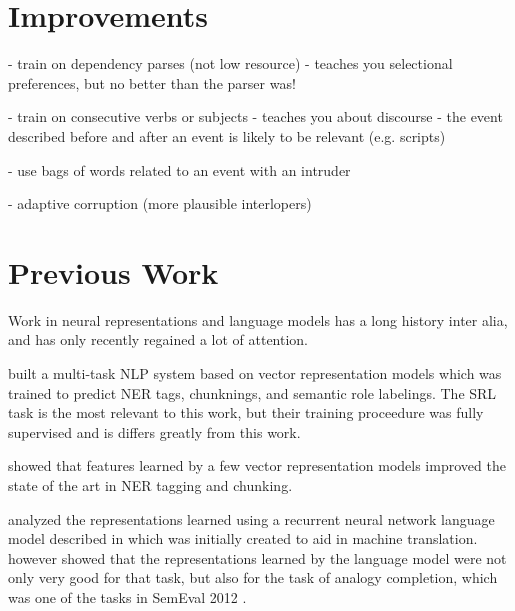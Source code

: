 \documentclass[11pt,letterpaper]{article}
\begin{document}
\section{Improvements}

- train on dependency parses (not low resource)
	- teaches you selectional preferences, but no better than the parser was!

- train on consecutive verbs or subjects
	- teaches you about discourse
	- the event described before and after an event is likely to be relevant (e.g. scripts)

- use bags of words related to an event with an intruder

- adaptive corruption (more plausible interlopers)



\section{Previous Work} %
Work in neural representations and language models has a long history
\cite{foundation1,foundation2,foundation3} inter alia,
and has only recently regained a lot of attention.


\cite{DBLP:conf/icml/CollobertW08} built a multi-task NLP system based
on vector representation models which was trained to predict NER tags,
chunknings, and semantic role labelings. The SRL task is the most relevant
to this work, but their training proceedure was fully supervised and
is differs greatly from this work.

\cite{turian} showed that features learned by
a few vector representation models improved the state of the art in NER tagging and chunking.


\cite{MikolovYZ13} analyzed the representations learned using
a recurrent neural network language model described in \cite{DBLP:conf/interspeech/KombrinkMKB11}
which was initially created to aid in machine translation.
\cite{MikolovYZ13} however showed that the representations learned by the
language model were not only very good for that task, but also for the
task of analogy completion, which was one of the tasks in SemEval 2012 \cite{semeval2012}.
\end{document}

